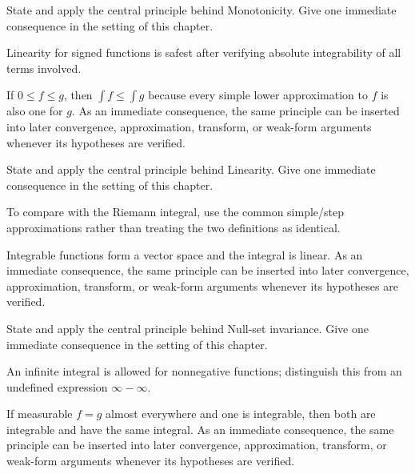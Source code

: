 \begin{exercise}\label{exr:iii03-05}
State and apply the central principle behind Monotonicity. Give one immediate consequence in the setting of this chapter.
\end{exercise}
\begin{hint}
Linearity for signed functions is safest after verifying absolute integrability of all terms involved.
\end{hint}
\begin{solution}
If $0\le f\le g$, then $\int f\le\int g$ because every simple lower approximation to $f$ is also one for $g$. As an immediate consequence, the same principle can be inserted into later convergence, approximation, transform, or weak-form arguments whenever its hypotheses are verified.
\end{solution}

\begin{exercise}\label{exr:iii03-06}
State and apply the central principle behind Linearity. Give one immediate consequence in the setting of this chapter.
\end{exercise}
\begin{hint}
To compare with the Riemann integral, use the common simple/step approximations rather than treating the two definitions as identical.
\end{hint}
\begin{solution}
Integrable functions form a vector space and the integral is linear. As an immediate consequence, the same principle can be inserted into later convergence, approximation, transform, or weak-form arguments whenever its hypotheses are verified.
\end{solution}

\begin{exercise}\label{exr:iii03-07}
State and apply the central principle behind Null-set invariance. Give one immediate consequence in the setting of this chapter.
\end{exercise}
\begin{hint}
An infinite integral is allowed for nonnegative functions; distinguish this from an undefined expression \(\infty-\infty\).
\end{hint}
\begin{solution}
If measurable $f=g$ almost everywhere and one is integrable, then both are integrable and have the same integral. As an immediate consequence, the same principle can be inserted into later convergence, approximation, transform, or weak-form arguments whenever its hypotheses are verified.
\end{solution}

